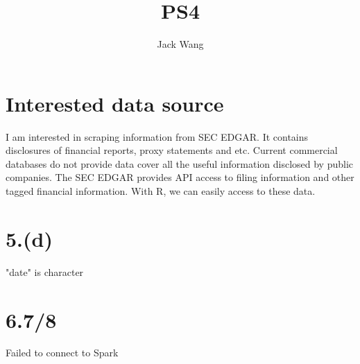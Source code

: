 \documentclass{article}
\title{PS4}
\author{Jack Wang}
\begin{document}
\maketitle

\section{Interested data source}
I am interested in scraping information from SEC EDGAR. It contains disclosures of financial reports, proxy statements and etc. Current commercial databases do not provide data cover all the useful information disclosed by public companies.
The SEC EDGAR provides API access to filing information and other tagged financial information. With R, we can easily access to these data.



\section{5.(d)}
"date" is character

\section{6.7/8}
Failed to connect to Spark
\end{document}
